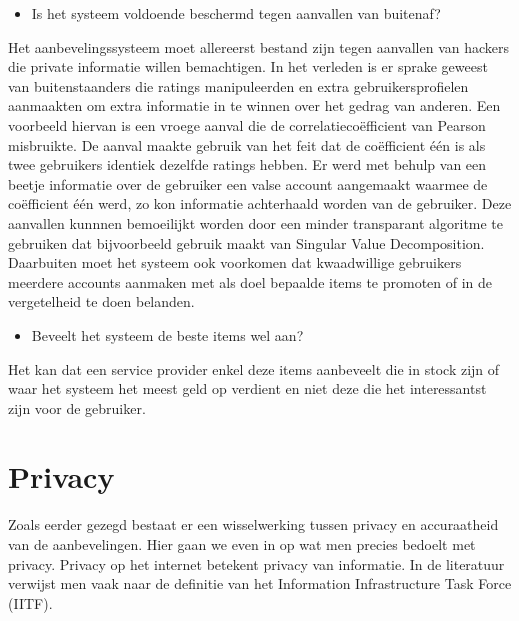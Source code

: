 \begin{itemize}
 
\item Is het systeem voldoende beschermd tegen aanvallen van buitenaf?
\end{itemize}
 Het aanbevelingssysteem moet allereerst bestand zijn tegen aanvallen van hackers die private informatie willen bemachtigen. In het verleden is er sprake geweest van buitenstaanders die ratings manipuleerden en extra gebruikersprofielen aanmaakten om extra informatie in te winnen over het gedrag van anderen. Een voorbeeld hiervan is een vroege aanval die de correlatieco\"efficient van Pearson misbruikte. De aanval maakte gebruik van het feit dat de co\"efficient \'e\'en is als twee gebruikers identiek dezelfde ratings hebben. Er werd met behulp van een beetje informatie over de gebruiker een valse account aangemaakt waarmee de co\"efficient \'e\'en werd, zo kon informatie achterhaald worden van de gebruiker. Deze aanvallen kunnnen bemoeilijkt worden door een minder transparant algoritme te gebruiken dat bijvoorbeeld gebruik maakt van Singular Value Decomposition. \\Daarbuiten moet het systeem ook voorkomen dat kwaadwillige gebruikers meerdere accounts aanmaken met als doel bepaalde items te promoten of in de vergetelheid te doen belanden. 
 
 \begin{itemize}
\item Beveelt het systeem de beste items wel aan?
\end{itemize}
 
  Het kan dat een service provider enkel deze items aanbeveelt die in stock zijn of waar het systeem het meest geld op verdient en niet deze die het interessantst zijn voor de gebruiker. 
  
 
\section{Privacy}
\label{sec:privacy}
Zoals eerder gezegd bestaat er een wisselwerking tussen privacy en accuraatheid van de aanbevelingen. Hier gaan we even in op wat men precies bedoelt met privacy. Privacy op het internet betekent privacy van informatie. In de literatuur verwijst men vaak naar de definitie van het Information Infrastructure Task Force (IITF).

